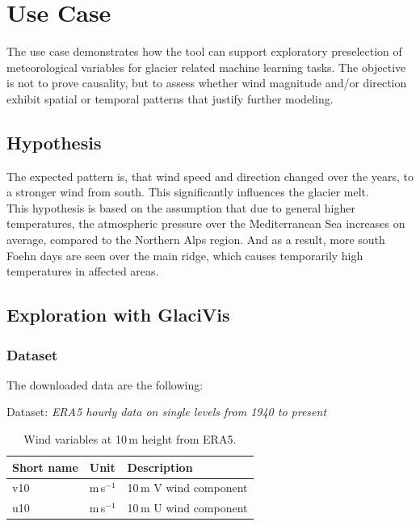 \chapter{Use Case}
\label{ch:use_case}

The use case demonstrates how the tool can support exploratory preselection of meteorological variables for glacier related machine learning tasks. The objective is not to prove causality, but to assess whether wind magnitude and/or direction exhibit spatial or temporal patterns that justify further modeling.

\section{Hypothesis}

The expected pattern is, that wind speed and direction changed over the years, to a stronger wind from south. This significantly influences the glacier melt. \\

This hypothesis is based on the assumption that due to general higher temperatures, the atmospheric pressure over the Mediterranean Sea increases on average, compared to the Northern Alps region. And as a result, more south Foehn days are seen over the main ridge, which causes temporarily high temperatures in affected areas.

\section{Exploration with GlaciVis}

\subsection{Dataset}

The downloaded data are the following:

\vspace{1em}
Dataset: \textit{ERA5 hourly data on single levels from 1940 to present}

\begin{table}[htbp]
\centering
\caption{Wind variables at 10\,m height from ERA5.}
\label{tab:era5_wind_variables}

\begin{tabular}{lll}
\toprule
Short name & Unit & Description \\
\midrule
v10 & m\,s$^{-1}$ & 10\,m V wind component \\
u10 & m\,s$^{-1}$ & 10\,m U wind component \\
\bottomrule
\end{tabular}

\end{table}


